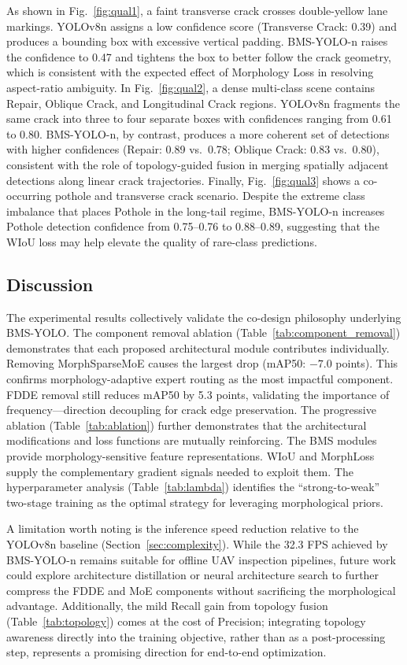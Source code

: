 \documentclass{ieeeaccess}
\begin{document}
As shown in Fig.~\ref{fig:qual1}, a faint transverse crack crosses double-yellow lane markings. YOLOv8n assigns a low confidence score (Transverse Crack: 0.39) and produces a bounding box with excessive vertical padding. BMS-YOLO-n raises the confidence to 0.47 and tightens the box to better follow the crack geometry, which is consistent with the expected effect of Morphology Loss in resolving aspect-ratio ambiguity. In Fig.~\ref{fig:qual2}, a dense multi-class scene contains Repair, Oblique Crack, and Longitudinal Crack regions. YOLOv8n fragments the same crack into three to four separate boxes with confidences ranging from 0.61 to 0.80. BMS-YOLO-n, by contrast, produces a more coherent set of detections with higher confidences (Repair: 0.89 vs.\ 0.78; Oblique Crack: 0.83 vs.\ 0.80), consistent with the role of topology-guided fusion in merging spatially adjacent detections along linear crack trajectories. Finally, Fig.~\ref{fig:qual3} shows a co-occurring pothole and transverse crack scenario. Despite the extreme class imbalance that places Pothole in the long-tail regime, BMS-YOLO-n increases Pothole detection confidence from 0.75--0.76 to 0.88--0.89, suggesting that the WIoU loss may help elevate the quality of rare-class predictions.

\subsection{Discussion}

The experimental results collectively validate the co-design philosophy underlying BMS-YOLO. The component removal ablation (Table~\ref{tab:component_removal}) demonstrates that each proposed architectural module contributes individually. Removing MorphSparseMoE causes the largest drop (mAP50: $-7.0$ points). This confirms morphology-adaptive expert routing as the most impactful component. FDDE removal still reduces mAP50 by 5.3 points, validating the importance of frequency---direction decoupling for crack edge preservation. The progressive ablation (Table~\ref{tab:ablation}) further demonstrates that the architectural modifications and loss functions are mutually reinforcing. The BMS modules provide morphology-sensitive feature representations. WIoU and MorphLoss supply the complementary gradient signals needed to exploit them. The hyperparameter analysis (Table~\ref{tab:lambda}) identifies the ``strong-to-weak'' two-stage training as the optimal strategy for leveraging morphological priors.

A limitation worth noting is the inference speed reduction relative to the YOLOv8n baseline (Section~\ref{sec:complexity}). While the 32.3 FPS achieved by BMS-YOLO-n remains suitable for offline UAV inspection pipelines, future work could explore architecture distillation or neural architecture search to further compress the FDDE and MoE components without sacrificing the morphological advantage. Additionally, the mild Recall gain from topology fusion (Table~\ref{tab:topology}) comes at the cost of Precision; integrating topology awareness directly into the training objective, rather than as a post-processing step, represents a promising direction for end-to-end optimization.
\end{document}
